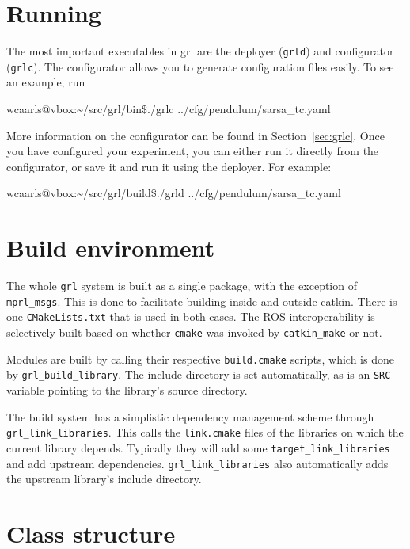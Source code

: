 \documentclass{article}
\makeatletter
\newcommand{\txt}[1]{\texttt{#1}}
\newcommand{\promptmb}{wcaarls@vbox:\~{}/src/grl/build\$\xspace}
\newcommand{\promptmn}{wcaarls@vbox:\~{}/src/grl/bin\$\xspace}
\newenvironment{code}{\alltt}{\endalltt}
\makeatother
\begin{document}
\section{Running}

The most important executables in grl are the deployer (\txt{grld}) and
configurator (\txt{grlc}). The configurator allows you to generate configuration
files easily. To see an example, run

\begin{code}
\promptmn ./grlc ../cfg/pendulum/sarsa\_tc.yaml
\end{code}

More information on the configurator can be found in
Section~\ref{sec:grlc}. Once you have configured your experiment, you can either run it directly
from the configurator, or save it and run it using the deployer. For
example:

\begin{code}
\promptmb ./grld ../cfg/pendulum/sarsa\_tc.yaml
\end{code}

\section{Build environment}

The whole \txt{grl} system is built as a single package, with the exception
of \txt{mprl\_msgs}. This is done to facilitate building inside and outside
catkin. There is one \txt{CMakeLists.txt} that is used in both cases. The
ROS interoperability is selectively built based on whether \txt{cmake} was invoked by
\txt{catkin\_make} or not.

Modules are built by calling their respective \txt{build.cmake} scripts,
which is done by \txt{grl\_build\_library}. The include directory is set
automatically, as is an \txt{SRC} variable pointing to the library's source
directory.

The build system has a simplistic dependency management scheme through
\txt{grl\_link\_libraries}. This calls the \txt{link.cmake} files of the
libraries on which the current library depends. Typically they will add some
\txt{target\_link\_libraries} and add upstream dependencies.
\txt{grl\_link\_libraries} also automatically adds the upstream library's
include directory.

\section{Class structure}
\end{document}
